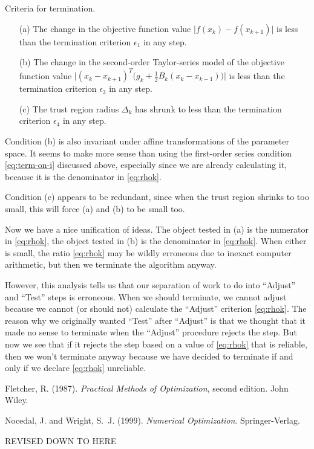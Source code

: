 \documentclass[11pt]{article}
\begin{document}
Criteria for termination.
\begin{enumerate}
\item[(a)] The change in the objective function
    value $\lvert f(x_k) - f(x_{k + 1}) \rvert$ is less than
    the termination criterion $\epsilon_1$ in any step.
\item[(b)] The change in the second-order Taylor-series model
    of the objective function
    value $\bigl\lvert (x_k - x_{k + 1})^T \bigl( g_k +
    \tfrac{1}{2} B_k (x_k - x_{k - 1}) \bigr) \bigr\rvert$
    is less than the termination criterion $\epsilon_3$ in
    any step.
\item[(c)] The trust region radius $\Delta_k$ has shrunk to less than
    the termination criterion $\epsilon_4$ in any step.
\end{enumerate}

Condition (b) is also invariant under affine transformations of the
parameter space.  It seems to make more sense than using the first-order
series condition \eqref{eq:term-on-i} discussed above, especially since
we are already calculating it, because it is the denominator
in \eqref{eq:rhok}.

Condition (c) appears to be redundant, since when the trust region
shrinks to too small, this will force (a) and (b) to be small too.

Now we have a nice unification of ideas.
The object tested in (a) is the numerator in \eqref{eq:rhok},
the object tested in (b) is the denominator in \eqref{eq:rhok}.
When either is small, the ratio \eqref{eq:rhok} may be wildly
erroneous due to inexact computer arithmetic, but then we terminate
the algorithm anyway.

However, this analysis tells us that our separation of work to do into
``Adjust'' and ``Test'' steps is erroneous.  When we should terminate,
we cannot adjust because we cannot (or should not) calculate the
``Adjust'' criterion \eqref{eq:rhok}.
The reason why we originally wanted ``Test'' after ``Adjust'' is that
we thought that it made no sense to terminate when the ``Adjust''
procedure rejects the step.
But now we see that if it rejects the step based on a value of
\eqref{eq:rhok} that is reliable, then we won't terminate anyway
because we have decided to terminate if and only if we declare
\eqref{eq:rhok} unreliable.

\begin{thebibliography}{}

Fletcher, R. (1987).
\newblock \emph{Practical Methods of Optimization}, second edition.
\newblock John Wiley.

Nocedal, J. and Wright, S.~J. (1999).
\newblock \emph{Numerical Optimization}.
\newblock Springer-Verlag.

\end{thebibliography}



\begin{center} \LARGE REVISED DOWN TO HERE \end{center}
\end{document}
